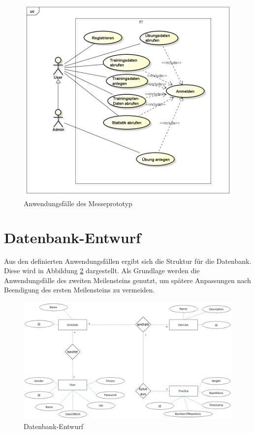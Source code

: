 \begin{figure}[h]
\centering
\includegraphics[width=0.8\linewidth]{content/images/UseCase-Messeprototyp.png}
\caption{Anwendungsfälle des Messeprototyp}
\label{pic:usecase-messe}
\end{figure}
\newpage
\section{Datenbank-Entwurf}
\label{sec:Datenbank-Entwurf}
Aus den definierten Anwendungsfällen ergibt sich die Struktur für die Datenbank. Diese wird in Abbildung \ref{pic:db-entwurf} dargestellt. Als Grundlage werden die Anwendungsfälle des zweiten Meilensteins genutzt, um spätere Anpassungen nach Beendigung des ersten Meilensteins zu vermeiden.

\begin{figure}[h]
\centering
\includegraphics[width=0.8\linewidth]{content/images/DB-Entwurf.png}
\caption{Datenbank-Entwurf}
\label{pic:db-entwurf}
\end{figure}

